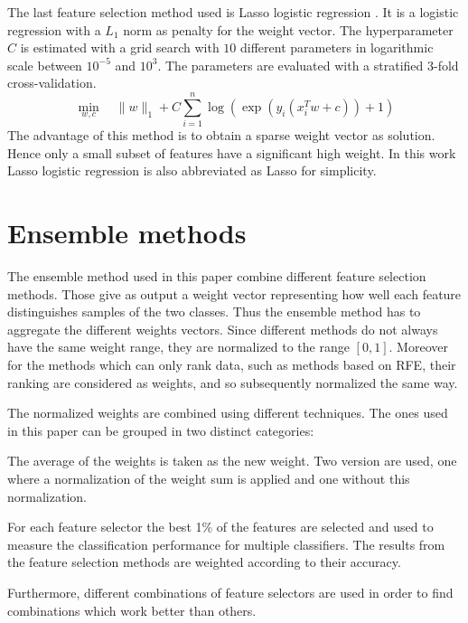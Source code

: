 \documentclass[twoside,11pt]{article}
\begin{document}
The last feature selection method used is Lasso logistic regression \citep{wheeler2010lasso}. It is a logistic regression with a $L_1$ norm as penalty for the weight vector. The hyperparameter $C$ is estimated with a grid search with $10$ different parameters in logarithmic scale between $10^{-5}$ and $10^3$. The parameters are evaluated with a stratified 3-fold cross-validation.
\begin{equation}
    \min_{w,c} \quad \|w\|_1 + C\sum_{i=1}^n \log(\exp(y_i(x_i^Tw + c))+1)
  \end{equation}
  The advantage of this method is to obtain a sparse weight vector as solution. Hence only a small subset of features have a significant high weight. In this work Lasso logistic regression is also abbreviated as Lasso for simplicity.
  
\section{Ensemble methods}
 The ensemble method used in this paper combine different feature selection methods. Those give as output a weight vector representing how well each feature distinguishes samples of the two classes. Thus the ensemble method has to aggregate the different weights vectors. Since different methods do not always have the same weight range, they are normalized to the range $[0,1]$. Moreover for the methods which can only rank data, such as methods based on RFE, their ranking are considered as weights, and so subsequently normalized the same way. 
 
 The normalized weights are combined using different techniques. The ones used in this paper can be grouped in two distinct categories: 

\begin{description}[align=left]
\item [Linear aggregation :] The average of the weights is taken as the new weight. Two version are used, one where a normalization of the weight sum is applied and one without this normalization.

\item [Performance related aggregation :] For each feature selector the best 1\% of the features are selected and used to measure the classification performance for multiple classifiers. The results from the feature selection methods are weighted according to their accuracy.
\end{description}

Furthermore, different combinations of feature selectors are used in order to find combinations which work better than others.
\end{document}
